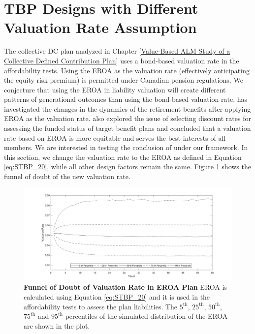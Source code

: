 \documentclass{sfuthesis}
\numberwithin{equation}{chapter}
\begin{document}
	\section{TBP Designs with Different Valuation Rate Assumption}
	\label{TBP Designs with Different Valuation Rate Assumption}

		\justify
		The collective DC plan analyzed in Chapter \ref{Value-Based ALM Study of a Collective Defined Contribution Plan} uses a bond-based valuation rate in the affordability tests. Using the EROA as the valuation rate (effectively anticipating the equity risk premium) is permitted under Canadian pension regulations. We conjecture that using the EROA in liability valuation will create different patterns of generational outcomes than using the bond-based valuation rate. \citet{Sanders2016a} has investigated the changes in the dynamics of the retirement benefits after applying EROA as the valuation rate. \citet{Ma2018} also explored the issue of selecting discount rates for assessing the funded status of target benefit plans and concluded that a valuation rate based on EROA is more equitable and serves the best interests of all members. We are interested in testing the conclusion of \citet{Ma2018} under our framework. In this section, we change the valuation rate to the EROA as defined in Equation \eqref{eq:STBP_20}, while all other design factors remain the same. Figure \ref{fig:Funnel of Doubt of Valuation Rate in EROA Plan} shows the funnel of doubt of the new valuation rate.
		\begin{figure}[h]
			\includegraphics[width=\linewidth]{ResultPlot/DISC1.pdf} 
			\caption[Funnel of Doubt of Valuation Rate in EROA Plan]{\textbf{Funnel of Doubt of Valuation Rate in EROA Plan}
			\vspace{-0.4cm}
			\newline\footnotesize\justify EROA is calculated using Equation \eqref{eq:STBP_20} and it is used in the affordability tests to assess the plan liabilities. The $5^{\text{th}}$, $25^{\text{th}}$, $50^{\text{th}}$, $75^{\text{th}}$ and $95^{\text{th}}$ percentiles of the simulated distribution of the EROA are shown in the plot.}
			\label{fig:Funnel of Doubt of Valuation Rate in EROA Plan}
		\end{figure}
\end{document}

